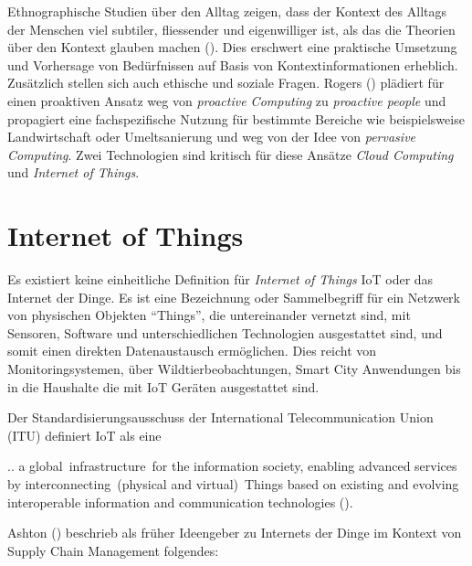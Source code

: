 \documentclass[
  11pt,
  a4paperpaper,
  oneside, openany  ,captions=tableheading
]{scrbook}
\theoremstyle{definition}
\theoremstyle{remark}
\renewenvironment{quote}{\begin{customblockquote}\list{}{\rightmargin=0em\leftmargin=0em}%
\item\relax\color{blockquote-text}\ignorespaces}{\unskip\unskip\endlist\end{customblockquote}}
\begin{document}
Ethnographische Studien über den Alltag zeigen, dass der Kontext des
Alltags der Menschen viel subtiler, fliessender und eigenwilliger ist,
als das die Theorien über den Kontext glauben machen
(). Dies
erschwert eine praktische Umsetzung und Vorhersage von Bedürfnissen auf
Basis von Kontextinformationen erheblich. Zusätzlich stellen sich auch
ethische und soziale Fragen. Rogers ()
plädiert für einen proaktiven Ansatz weg von \emph{proactive Computing}
zu \emph{proactive people} und propagiert eine fachspezifische Nutzung
für bestimmte Bereiche wie beispielsweise Landwirtschaft oder
Umeltsanierung und weg von der Idee von \emph{pervasive Computing}. Zwei
Technologien sind kritisch für diese Ansätze \emph{Cloud Computing} und
\emph{Internet of Things}.

\section{Internet of Things}\label{internet-of-things}

Es existiert keine einheitliche Definition für \emph{Internet of Things}
IoT oder das Internet der Dinge. Es ist eine Bezeichnung oder
Sammelbegriff für ein Netzwerk von physischen Objekten ``Things'', die
untereinander vernetzt sind, mit Sensoren, Software und
unterschiedlichen Technologien ausgestattet sind, und somit einen
direkten Datenaustausch ermöglichen. Dies reicht von Monitoringsystemen,
über Wildtierbeobachtungen, Smart City Anwendungen bis in die Haushalte
die mit IoT Geräten ausgestattet sind.

Der Standardisierungsausschuss der International Telecommunication Union
(ITU) definiert IoT als eine

\begin{quote}
.. a global~infrastructure~for the information society, enabling
advanced services by interconnecting~(physical and virtual)~Things based
on existing and evolving interoperable information and communication
technologies ().
\end{quote}

Ashton () beschrieb als früher Ideengeber
zu Internets der Dinge im Kontext von Supply Chain Management folgendes:
\end{document}
